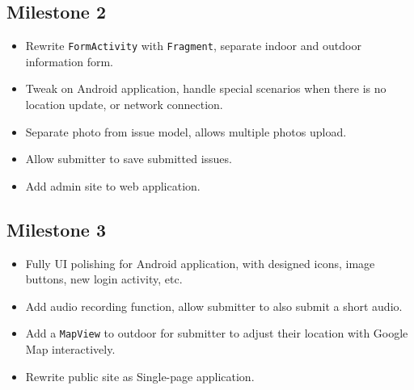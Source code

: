 \documentclass{acm_proc_article-sp}
\begin{document}
\subsection{Milestone 2}
\begin{itemize}
\item
Rewrite \texttt{FormActivity} with \texttt{Fragment}, separate indoor and outdoor information form.
\item
Tweak on Android application, handle special scenarios when there is no location update, or network connection.
\item
Separate photo from issue model, allows multiple photos upload.
\item
Allow submitter to save submitted issues.
\item
Add admin site to web application.
\end{itemize}
\subsection{Milestone 3}
\begin{itemize}
\item
Fully UI polishing for Android application, with designed icons, image buttons, new login activity, etc.
\item
Add audio recording function, allow submitter to also submit a short audio.
\item
Add a \texttt{MapView} to outdoor for submitter to adjust their location with Google Map interactively.
\item
Rewrite public site as Single-page application.
\end{itemize}
\end{document}
